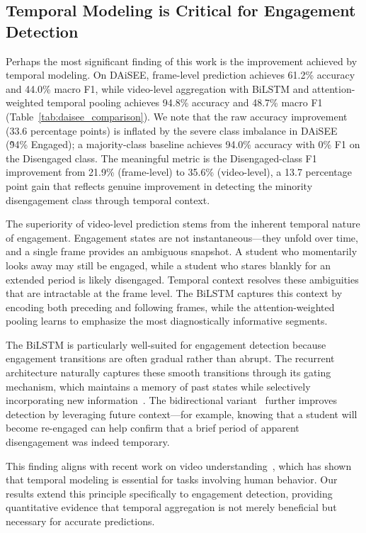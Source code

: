 \documentclass[sensors,article,submit,pdftex,moreauthors]{Definitions/mdpi}
\begin{document}
\subsection{Temporal Modeling is Critical for Engagement Detection}
\label{sec:temporal_discussion}

Perhaps the most significant finding of this work is the improvement achieved by temporal modeling. On DAiSEE, frame-level prediction achieves 61.2\% accuracy and 44.0\% macro F1, while video-level aggregation with BiLSTM and attention-weighted temporal pooling achieves 94.8\% accuracy and 48.7\% macro F1 (Table~\ref{tab:daisee_comparison}). We note that the raw accuracy improvement (33.6 percentage points) is inflated by the severe class imbalance in DAiSEE (\~94\% Engaged); a majority-class baseline achieves 94.0\% accuracy with 0\% F1 on the Disengaged class. The meaningful metric is the Disengaged-class F1 improvement from 21.9\% (frame-level) to 35.6\% (video-level), a 13.7 percentage point gain that reflects genuine improvement in detecting the minority disengagement class through temporal context.

The superiority of video-level prediction stems from the inherent temporal nature of engagement. Engagement states are not instantaneous---they unfold over time, and a single frame provides an ambiguous snapshot. A student who momentarily looks away may still be engaged, while a student who stares blankly for an extended period is likely disengaged. Temporal context resolves these ambiguities that are intractable at the frame level. The BiLSTM captures this context by encoding both preceding and following frames, while the attention-weighted pooling learns to emphasize the most diagnostically informative segments.

The BiLSTM is particularly well-suited for engagement detection because engagement transitions are often gradual rather than abrupt. The recurrent architecture naturally captures these smooth transitions through its gating mechanism, which maintains a memory of past states while selectively incorporating new information~\cite{hochreiter1997lstm}. The bidirectional variant~\cite{schuster1997bilstm} further improves detection by leveraging future context---for example, knowing that a student will become re-engaged can help confirm that a brief period of apparent disengagement was indeed temporary.

This finding aligns with recent work on video understanding~\cite{yue2015beyond,sun2019lattice}, which has shown that temporal modeling is essential for tasks involving human behavior. Our results extend this principle specifically to engagement detection, providing quantitative evidence that temporal aggregation is not merely beneficial but necessary for accurate predictions.
\end{document}
